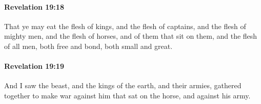 		\paragraph{Revelation 19:18} %
			\label{REVELATIONNT-19-18}

			That ye may eat the flesh of kings, and the flesh of captains, and the flesh of mighty men, and the flesh of horses, and of them that sit on them, and the flesh of all men, both free and bond, both small and great.

			\begin{framed}
			\scriptsize
				\begin{compactdesc}
					\item[SBLG] 
				\end{compactdesc}
			\end{framed}

		\paragraph{Revelation 19:19} %
			\label{REVELATIONNT-19-19}

			And I saw the beast, and the kings of the earth, and their armies, gathered together to make war against him that sat on the horse, and against his army.

